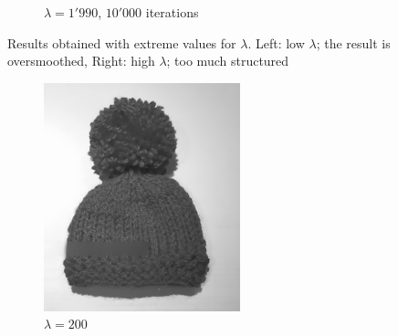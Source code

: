 \documentclass{paper}
\begin{document}
\begin{figure}[ht]
\begin{subfigure}[h]{0.45\textwidth}
    \caption*{$\lambda = 1'990$, $10'000$ iterations}
 \end{subfigure}
 \caption{Results obtained with extreme values for $\lambda$. Left: low $\lambda$; the result is oversmoothed, Right: high $\lambda$; too much structured}
 \label{fig:extreme-lambda-values}
\end{figure}
\begin{figure}[ht]
 \centering
 \begin{subfigure}[h]{0.3\textwidth}
    \centering
    \includegraphics[width=\textwidth]{hat-iter10000-lambda200-alpha0_001}
    \caption*{$\lambda = 200$}
 \end{subfigure}
~
 \begin{subfigure}[h]{0.3\textwidth}
    \centering

\end{subfigure}
\end{figure}
\end{document}
